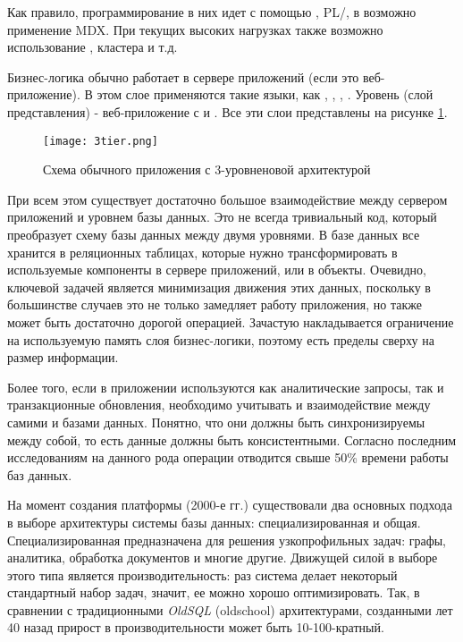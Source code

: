 Как правило, программирование в них идет с помощью \sql, PL/\sql, в \olap возможно применение MDX. При текущих высоких нагрузках также возможно использование \nosql, \hadoop кластера и т.д.

Бизнес-логика обычно работает в сервере приложений (если это веб-приложение). В этом слое применяются такие языки, как \java, \csharp, \python, \scala.
Уровень \ui (слой представления) - веб-приложение с \html и \js. Все эти слои представлены на рисунке \ref{fig:technology:logicblox:three_tier_architecture}.

\begin{figure}
	\centering
	\texttt{[image: 3tier.png]}
	\caption{Схема обычного приложения с 3-уровненовой архитектурой}
	\label{fig:technology:logicblox:three_tier_architecture}
\end{figure}

При всем этом существует достаточно большое взаимодействие между сервером приложений и уровнем базы данных. Это не всегда тривиальный код, который преобразует схему базы данных между двумя уровнями. В базе данных все хранится в реляционных таблицах, которые нужно трансформировать в используемые компоненты в сервере приложений, или в объекты. Очевидно, ключевой задачей является минимизация движения этих данных, поскольку в большинстве случаев это не только замедляет работу приложения, но также может быть достаточно дорогой операцией. Зачастую накладывается ограничение на используемую память слоя бизнес-логики, поэтому есть пределы сверху на размер информации.

Более того, если в приложении используются как аналитические запросы, так и транзакционные обновления, необходимо учитывать и взаимодействие между самими \olap и \oltp базами данных. Понятно, что они должны быть синхронизируемы между собой, то есть данные должны быть консистентными. Согласно последним исследованиям на данного рода операции отводится свыше 50\% времени работы баз данных.

На момент создания платформы (2000-е гг.) существовали два основных подхода в выборе архитектуры системы базы данных: специализированная и общая. Специализированная предназначена для решения узкопрофильных задач: графы, аналитика, обработка документов и многие другие. Движущей силой в выборе этого типа является производительность: раз система делает некоторый стандартный набор задач, значит, ее можно хорошо оптимизировать. Так, в сравнении с традиционными \emph{OldSQL} (oldschool) архитектурами, созданными лет 40 назад прирост в производительности может быть 10-100-кратный.

